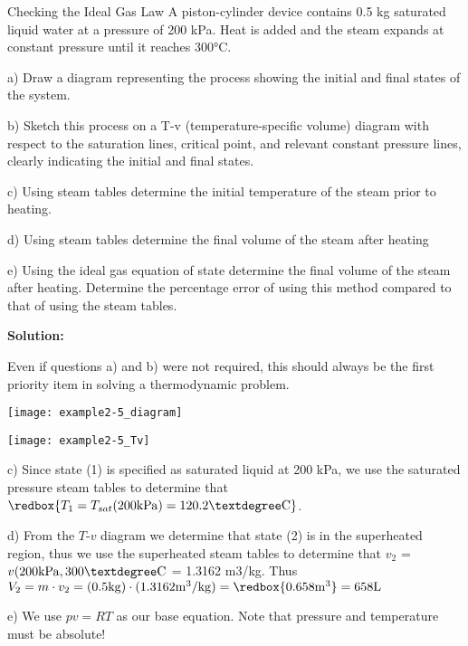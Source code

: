 \begin{example}{Checking the Ideal Gas Law}
A piston-cylinder device contains 0.5 kg saturated liquid water at a pressure of 200 kPa. Heat is added and the steam expands at constant pressure until it reaches 300°C.

a) Draw a diagram representing the process showing the initial and final states of the system.

b) Sketch this process on a T-v (temperature-specific volume) diagram with respect to the saturation lines, critical point, and relevant constant pressure lines, clearly indicating the initial and final states.

c) Using steam tables determine the initial temperature of the steam prior to heating.

d) Using steam tables determine the final volume of the steam after heating

e) Using the ideal gas equation of state determine the final volume of the steam after heating. Determine the percentage error of using this method compared to that of using the steam tables.


{\bf Solution:}

Even if questions a) and b) were not required, this should always be the first priority item in solving a thermodynamic problem.

\begin{center}
\texttt{[image: example2-5\_diagram]}
\end{center}

\begin{center}
\texttt{[image: example2-5\_Tv]}
\end{center}

c) Since state (1) is specified as saturated liquid at 200 kPa, we use the saturated pressure steam tables to determine that $\redbox{T_1=T_{sat}(200{\rm kPa}) = 120.2°{\rm C}}$.

d) From the $T$-$v$ diagram we determine that state (2) is in the superheated region, thus we use the superheated steam tables to determine that $v_2$ = $v({\rm 200kPa,300°C}$ = 1.3162 m3/kg. Thus $V_2 = m\cdot v_2 = (0.5{\rm kg})\cdot (1.3162 {\rm m^3/kg}) = \redbox{0.658 {\rm m^3}} = 658 {\rm L}$

e) We use $pv = RT$ as our base equation.  Note that pressure and temperature must be absolute!


\end{example}

